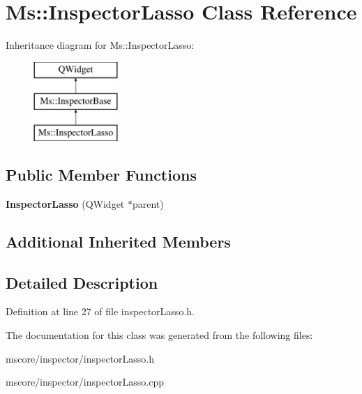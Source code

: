 \hypertarget{class_ms_1_1_inspector_lasso}{}\section{Ms\+:\+:Inspector\+Lasso Class Reference}
\label{class_ms_1_1_inspector_lasso}
Inheritance diagram for Ms\+:\+:Inspector\+Lasso\+:\begin{figure}[H]
\begin{center}
\leavevmode
\includegraphics[height=3.000000cm]{class_ms_1_1_inspector_lasso}
\end{center}
\end{figure}
\subsection*{Public Member Functions}
\begin{DoxyCompactItemize}
\item 
\mbox{\label{class_ms_1_1_inspector_lasso_aac28d56e11be599752b8c91d9e195309}} 
{\bfseries Inspector\+Lasso} (Q\+Widget $\ast$parent)
\end{DoxyCompactItemize}
\subsection*{Additional Inherited Members}


\subsection{Detailed Description}


Definition at line 27 of file inspector\+Lasso.\+h.



The documentation for this class was generated from the following files\+:\begin{DoxyCompactItemize}
\item 
mscore/inspector/inspector\+Lasso.\+h\item 
mscore/inspector/inspector\+Lasso.\+cpp\end{DoxyCompactItemize}
